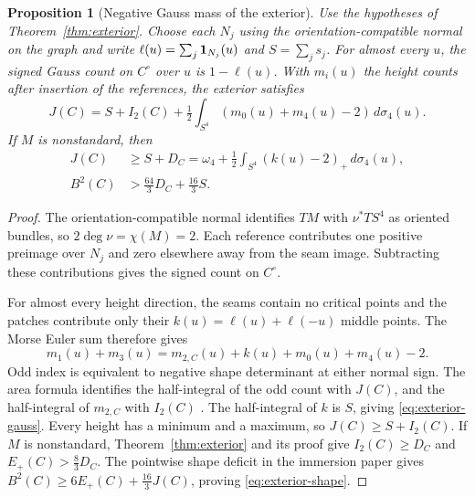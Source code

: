\documentclass[11pt,letterpaper]{article}
\numberwithin{equation}{section}
\newtheorem{proposition}[theorem]{Proposition}
\theoremstyle{definition}
\begin{document}
\begin{proposition}[Negative Gauss mass of the exterior]\label{prop:relative-gauss}
Use the hypotheses of Theorem~\ref{thm:exterior}. Choose each
\(N_j\) using the orientation-compatible normal on the graph
and write \(\ell(u)=\sum_j{\bf1}_{N_j}(u)\) and \(S=\sum_j s_j\).
For almost every \(u\), the signed Gauss count on \(C^\circ\)
over \(u\) is \(1-\ell(u)\). With \(m_i(u)\) the height counts after
insertion of the references, the exterior satisfies
\begin{equation}\label{eq:exterior-gauss}
 J(C)=S+I_2(C)+\tfrac12\int_{S^4}
                 (m_0(u)+m_4(u)-2)\,d\sigma_4(u).
\end{equation}
If \(M\) is nonstandard, then
\begin{equation}\label{eq:exterior-shape}
 \begin{aligned}
 J(C)&\ge S+D_C=\omega_4+\tfrac12\int_{S^4}(k(u)-2)_+\,d\sigma_4(u),\\
 B^2(C)&>\tfrac{64}{3}D_C+\tfrac{16}{3}S .
 \end{aligned}
\end{equation}
\end{proposition}

\begin{proof}
The orientation-compatible normal identifies \(TM\) with
\(\nu^*TS^4\) as oriented bundles, so \(2\deg\nu=\chi(M)=2\).
Each reference contributes one positive preimage over \(N_j\)
and zero elsewhere away from the seam image. Subtracting these
contributions gives the signed count on \(C^\circ\).

For almost every height direction, the seams contain no critical
points and the patches contribute only their \(k(u)=\ell(u)+\ell(-u)\)
middle points. The Morse Euler sum therefore gives
\[
 m_1(u)+m_3(u)=m_{2,C}(u)+k(u)+m_0(u)+m_4(u)-2 .
\]
Odd index is equivalent to negative shape determinant at either
normal sign. The area formula identifies the half-integral of
the odd count with \(J(C)\), and the half-integral of \(m_{2,C}\)
with \(I_2(C)\) \cite[\S3, equation (5)]{OntiVlachos2017Hypersurfaces}.
The half-integral of \(k\) is \(S\), giving \eqref{eq:exterior-gauss}.
Every height has a minimum and a maximum, so \(J(C)\ge S+I_2(C)\).
If \(M\) is nonstandard, Theorem~\ref{thm:exterior} and its proof
give \(I_2(C)\ge D_C\) and \(E_+(C)>\frac83D_C\).
The pointwise shape deficit in the immersion paper
\cite[Proposition 2.1]{Baker2026ImmersionEnergy} gives
\(B^2(C)\ge 6E_+(C)+\frac{16}{3}J(C)\), proving
\eqref{eq:exterior-shape}.
\end{proof}
\end{document}
